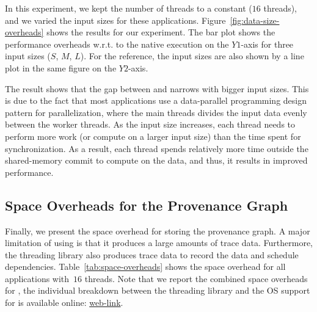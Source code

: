 In this experiment, we kept the number of threads to a constant  ($16$ threads), and we varied the input sizes for these applications.  Figure~\ref{fig:data-size-overheads} shows the results for our experiment. The bar plot shows the performance overheads w.r.t. to the native \pthreads execution on the $Y1$-axis for three input sizes ($S$, $M$, $L$). For the reference, the input sizes are also shown by a line plot in the same figure on the $Y2$-axis. 

The result shows that the gap between \pthreads and \projecttitle narrows with bigger input sizes. This is due to the fact that most applications use a data-parallel programming design pattern for parallelization, where the main threads divides the input data evenly between the worker threads. As the input size increases, each thread needs to perform more work (or compute on a larger input size) than the time spent for synchronization. As a result, each thread spends relatively more time outside the shared-memory commit to compute on the data, and thus, it results in improved performance.
 

%











\subsection{Space Overheads for the Provenance Graph}
\label{subsec:overheads-breakdown}

Finally, we present the space overhead for storing the provenance graph. A major limitation of using \intelpt is that it produces a large amounts of trace data. Furthermore, the threading library also produces trace data to record the data and schedule dependencies.  Table~\ref{tab:space-overheads} shows the space overhead for all applications with~$16$ threads. Note that we report the combined space overheads for \projecttitle, the individual breakdown between the threading library and the OS support for \intelpt is available online:  \href{https://mic92.github.io/inspector/index.html\#measurement_table}{web-link}. 

